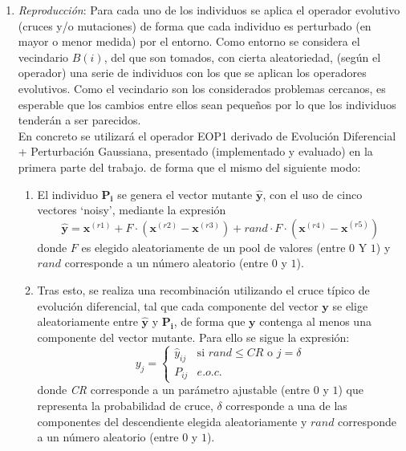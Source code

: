 \begin{enumerate}
	\justifying
	
    \item \textit{Reproducción}: Para cada uno de los individuos se aplica el operador evolutivo (cruces y/o mutaciones) de forma que cada individuo es perturbado (en mayor o menor medida) por el entorno. Como entorno se considera el vecindario $B(i)$, del que son tomados, con cierta aleatoriedad, (según el operador) una serie de individuos con los que se aplican los operadores evolutivos. Como el vecindario son los considerados problemas cercanos, es esperable que los cambios entre ellos sean pequeños por lo que los individuos tenderán a ser parecidos.\\
    
    En concreto se utilizará el operador EOP1 derivado de Evolución Diferencial + Perturbación Gaussiana, presentado (implementado y evaluado) en la primera parte del trabajo. de forma que el mismo del siguiente modo:\\

    \begin{enumerate}
        \item  El individuo $\boldsymbol{P_i}$ se genera el vector mutante $\boldsymbol{\hat{y}}$, con el uso de cinco vectores `noisy', mediante la expresión  $$\boldsymbol{\hat{y}}=\boldsymbol{x}^{(r1)} + F \cdot (\boldsymbol{x}^{(r2)}- \boldsymbol{x}^{(r3)}) + rand \cdot  F \cdot (\boldsymbol{x}^{(r4)}- \boldsymbol{x}^{(r5)}) $$ donde $F$ es elegido aleatoriamente de un pool de valores (entre $0$ Y $1$) y $rand$ corresponde a un número aleatorio (entre $0$ y $1$).\\
        
        \item  Tras esto, se realiza una recombinación utilizando el cruce típico de evolución diferencial, tal que cada componente del vector $\boldsymbol{y}$ se elige aleatoriamente entre $\boldsymbol{\hat{y}}$  y $\boldsymbol{P_i}$, de forma que $\boldsymbol{y}$ contenga al menos una componente del vector mutante. Para ello se sigue la expresión: $$ y_j = \left\lbrace \begin{array}{cl}
            \hat{y}_{ij} & \textrm{si } rand \leq \textit{CR} \textrm{ o } j = \delta\\
             P_{ij} & e.o.c.
        \end{array} \right. $$ donde \textit{CR} corresponde a un parámetro ajustable (entre $0$ y $1$) que representa la probabilidad de cruce, $\delta$ corresponde a una de las componentes del descendiente elegida aleatoriamente y $rand$ corresponde a un número aleatorio (entre $0$ y $1$).\\
        

\end{enumerate}
\end{enumerate}
